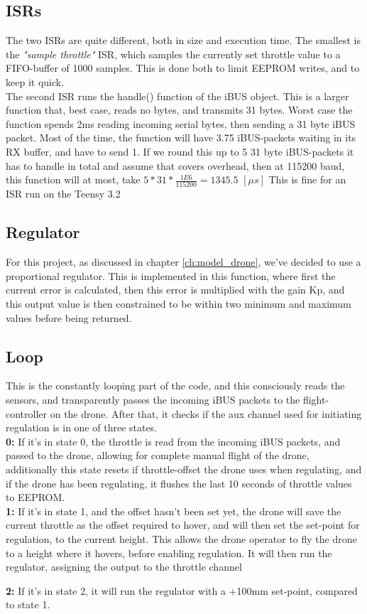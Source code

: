 \subsection*{ISRs}
The two ISRs are quite different, both in size and execution time.
The smallest is the \textit{"sample throttle"} ISR, which samples the currently set throttle value to a FIFO-buffer of 1000 samples. This is done both to limit EEPROM writes, and to keep it quick.\\

The second ISR runs the handle() function of the iBUS object. This is a larger function that, best case, reads no bytes, and transmits 31 bytes. 
Worst case the function spends 2ms reading incoming serial bytes, then sending a 31 byte iBUS packet.
Most of the time, the function will have 3.75 iBUS-packets waiting in its RX buffer, and have to send 1. If we round this up to 5 31 byte iBUS-packets it has to handle in total and assume that covers overhead, then at 115200 baud, this function will at most, take $5 * 31 * \frac{1E6}{115200} = 1345.5$  $[\mu{}s]$ 
This is fine for an ISR run on the Teensy 3.2

\subsection*{Regulator}
For this project, as discussed in chapter \ref{ch:model_drone}, we've decided to use a proportional regulator. This is implemented in this function, where first the current error is calculated, then this error is multiplied with the gain Kp, and this output value is then constrained to be within two minimum and maximum values before being returned. 

\subsection*{Loop}
This is the constantly looping part of the code, and this consciously reads the sensors, and transparently passes the incoming iBUS packets to the flight-controller on the drone. After that, it checks if the aux channel used for initiating regulation is in one of three states.\\

\textbf{0:}
If it's in state 0, the throttle is read from the incoming iBUS packets, and passed to the drone, allowing for complete manual flight of the drone, additionally this state resets if throttle-offset the drone uses when regulating, and if the drone has been regulating, it flushes the last 10 seconds of throttle values to EEPROM.\\

\textbf{1:}
If it's in state 1, and the offset hasn't been set yet, the drone will save the current throttle as the offset required to hover, and will then set the set-point for regulation, to the current height.
This allows the drone operator to fly the drone to a height where it hovers, before enabling regulation. 
It will then run the regulator, assigning the output to the throttle channel

\textbf{2:}
If it's in state 2, it will run the regulator with a +100mm set-point, compared to state 1.

